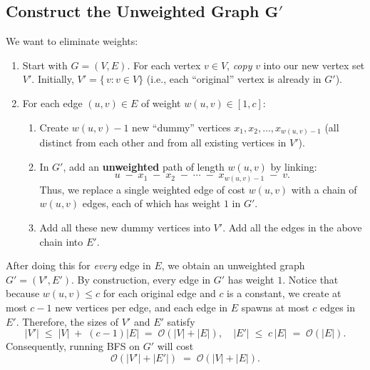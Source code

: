 \documentclass[11pt]{article}
\begin{document}
    \subsection*{Construct the Unweighted Graph \(\boldsymbol{G'}\)}
    We want to eliminate weights:
    \begin{enumerate}
        \item Start with \(G=(V,E)\). For each vertex \(v \in V\), \emph{copy} \(v\) into our new vertex set \(V'\). Initially, \(V' = \{\, v : v \in V\}\) (i.e., each ``original'' vertex is already in \(G'\)).
    
        \item For each edge \((u,v)\in E\) of weight \(w(u,v)\in [1,c]\):
        \begin{enumerate}
            \item Create \(w(u,v)-1\) new ``dummy'' vertices \(x_1, x_2, \ldots, x_{w(u,v)-1}\) (all distinct from each other and from all existing vertices in \(V'\)).
            \item In \(G'\), add an \textbf{unweighted} path of length \(w(u,v)\) by linking:
            \[
              u \;-\; x_1 \;-\; x_2 \;-\; \cdots \;-\; x_{w(u,v)-1} \;-\; v.
            \]
            Thus, we replace a single weighted edge of cost \(w(u,v)\) with a chain of \(w(u,v)\) edges, each of which has weight \(1\) in \(G'\).
            \item Add all these new dummy vertices into \(V'\). Add all the edges in the above chain into \(E'\).
        \end{enumerate}
    \end{enumerate}
    
    After doing this for \emph{every} edge in \(E\), we obtain an unweighted graph \(G'=(V', E')\). By construction, every edge in \(G'\) has weight \(1\). Notice that because \(w(u,v)\le c\) for each original edge and \(c\) is a constant, we create at most \(c-1\) new vertices per edge, and each edge in \(E\) spawns at most \(c\) edges in \(E'\). Therefore, the sizes of \(V'\) and \(E'\) satisfy
    \[
      |V'| \;\le\; |V| \;+\; (c-1)|E| \;=\; \mathcal{O}(|V| + |E|),
      \quad
      |E'| \;\le\; c \,|E| \;=\; \mathcal{O}(|E|).
    \]
    Consequently, running BFS on \(G'\) will cost
    \[
      \mathcal{O}(|V'| + |E'|) \;=\; \mathcal{O}(|V| + |E|).
    \]
    
\end{document}
